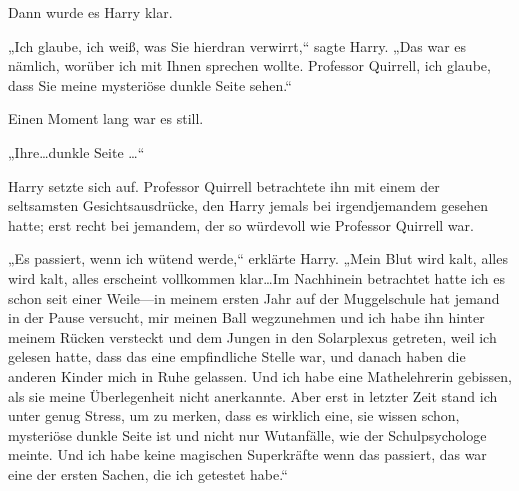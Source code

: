Dann wurde es Harry klar.

„Ich glaube, ich weiß, was Sie hierdran verwirrt,“ sagte Harry. „Das war es nämlich, worüber ich mit Ihnen sprechen wollte. Professor Quirrell, ich glaube, dass Sie meine mysteriöse dunkle Seite sehen.“

Einen Moment lang war es still.

„Ihre…dunkle Seite …“

Harry setzte sich auf. Professor Quirrell betrachtete ihn mit einem der seltsamsten Gesichtsausdrücke, den Harry jemals bei irgendjemandem gesehen hatte; erst recht bei jemandem, der so würdevoll wie Professor Quirrell war.

„Es passiert, wenn ich wütend werde,“ erklärte Harry. „Mein Blut wird kalt, alles wird kalt, alles erscheint vollkommen klar…Im Nachhinein betrachtet hatte ich es schon seit einer Weile—in meinem ersten Jahr auf der Muggelschule hat jemand in der Pause versucht, mir meinen Ball wegzunehmen und ich habe ihn hinter meinem Rücken versteckt und dem Jungen in den Solarplexus getreten, weil ich gelesen hatte, dass das eine empfindliche Stelle war, und danach haben die anderen Kinder mich in Ruhe gelassen. Und ich habe eine Mathelehrerin gebissen, als sie meine Überlegenheit nicht anerkannte. Aber erst in letzter Zeit stand ich unter genug Stress, um zu merken, dass es wirklich eine, sie wissen schon, mysteriöse dunkle Seite ist und nicht nur Wutanfälle, wie der Schulpsychologe meinte. Und ich habe keine magischen Superkräfte wenn das passiert, das war eine der ersten Sachen, die ich getestet habe.“

